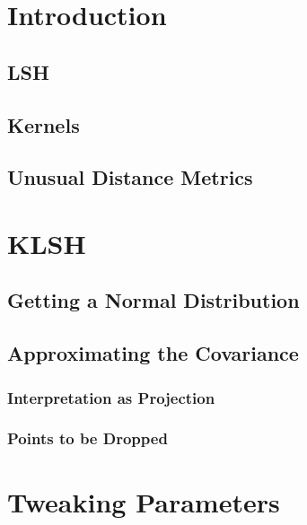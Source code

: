 \documentclass[twoside,11pt]{homework}
\begin{document}
\maketitle

\begin{abstract}
\end{abstract}

\section{Introduction}

\subsection{LSH} %

\subsection{Kernels} %

\subsection{Unusual Distance Metrics} %

\section{KLSH}

\subsection{Getting a Normal Distribution} %

\subsection{Approximating the Covariance} %

\subsubsection{Interpretation as Projection} %

\subsubsection{Points to be Dropped} %

\section{Tweaking Parameters} %
\end{document}
